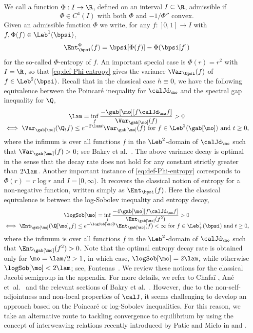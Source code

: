 We call a function $\Phi:I \to \R$, defined on an interval $I \subseteq \R$, admissible if
\begin{equation}
\label{eq:def-admissible}
\text{$\Phi \in C^4(I)$ with both $\Phi$ and $-1/\Phi''$ convex.}
\end{equation}
Given an admissible function $\Phi$ we write, for any $f:[0,1] \to I$ with $f, \Phi(f) \in \Leb^1(\bpsi)$,
\begin{equation}
\label{eq:def-Phi-entropy}
\Ent_\bpsi^\Phi(f) = \bpsi[\Phi(f)] - \Phi(\bpsi [f])
\end{equation}
for the so-called $\Phi$-entropy of $f$. An important special case is $\Phi(r) = r^2$ with $I = \R$, so that \eqref{eq:def-Phi-entropy} gives the variance $\Var_\bpsi(f)$ of $f \in \Leb^2(\bpsi)$. Recall that in the classical case $h \equiv 0$, we have the following equivalence between the Poincaré inequality for $\calJd_\mo$ and the spectral gap inequality for $\Q$,
\begin{multline*}
\lam = \inf_f \frac{-\gab[\mo][f \calJd_\mo f]}{\Var_{\gab[\mo]}(f)} > 0\\[-5pt]
\iff \Var_{\gab[\mo]}(\Q_t f ) \leq e^{-2\lam t} \Var_{\gab[\mo]}(f) \text{ for } f \in \Leb^2(\gab[\mo]) \text{ and } t \geq 0,
\end{multline*}
where the infimum is over all functions $f$ in the $\Leb^2$-domain of $\calJd_\mo$ such that
\hbox{$\Var_{\gab[\mo]}(f) > 0$}; see \eg Bakry et al.~\cite[Chap.\,4.2]{Bakry_Book}. The above variance decay is optimal in the sense that the decay rate does not hold for any constant strictly greater than $2\lam$. Another important instance of \eqref{eq:def-Phi-entropy} corresponds to $\Phi(r)=r\log r$ and $I = [0, \infty)$. It recovers the classical notion of entropy for a non-negative function, written simply as $\Ent_\bpsi(f)$. Here the classical equivalence is between the log-Sobolev inequality and entropy decay,
\begin{multline*}
\logSob[\mo] = \inf_f \frac{-4\gab[\mo] [f \calJd_\mo f]}{\Ent_{\gab[\mo]} (f^2)} > 0\\[-5pt]
\iff \Ent_{\gab[\mo]} (\Q[\mo]_tf) \leq e^{-\logSob[\mo] t} \Ent_{\gab[\mo]} (f) < \infty \text{ for } f \in \Leb^1_+(\bpsi) \text{ and } t \geq 0,
\end{multline*}
where the infimum is over all functions $f$ in the $\Leb^2$-domain of $\calJd_\mo$ such that \hbox{$\Ent_{\gab[\mo]} (f^2) > 0$}.
Note that the optimal entropy decay rate is obtained only for $\mo = \lam/2 > 1$, in which case, $\logSob[\mo] = 2\lam$, while otherwise $\logSob[\mo] < 2\lam$; see, \eg Fontenas~\cite{fontenas:1998}. We review these notions for the classical Jacobi semigroup in the appendix. For more details, we refer to Chafaï \cite{chafai}, Ané et~al.~\cite{logSobolev-book} and the relevant sections of Bakry et al.~\cite{Bakry_Book}. However, due to the non-self-adjointness and non-local properties of $\calJ$, it seems challenging to develop an approach based on the Poincaré or log-Sobolev inequalities. For this reason, we take an alternative route to tackling convergence to equilibrium by using the concept of interweaving relations recently introduced by Patie and Miclo in \cite[\S 3.5]{Gateway} and \cite{Patie-Miclo}.

